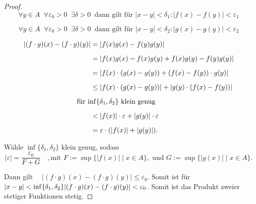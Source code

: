 \documentclass[a4paper,12pt]{article}
\theoremstyle{definition}
\theoremstyle{remark}
\begin{document}
\begin{proof}

\[
\forall y \in A \;\; \forall \varepsilon_0 > 0 \;\; \exists \delta > 0 \;\; 
\text{dann gilt für } |x-y| < \delta_1 : |f(x) - f(y)| < \varepsilon_1
\]

\[
\forall y \in A \;\; \forall \varepsilon_0 > 0 \;\; \exists \delta > 0 \;\; 
\text{dann gilt für } |x-y| < \delta_2 : |g(x) - g(y)| < \varepsilon_2
\]

\begin{align*}
|(f \cdot g)(x) - (f \cdot g)(y)| 
&= | f(x) g(x) - f(y) g(y) | \\[2mm]
&= | f(x) g(x) - f(x) g(y) + f(x) g(y) - f(y) g(y) | \\[2mm]
&= | f(x) \cdot (g(x) - g(y)) + (f(x) - f(y)) \cdot g(y) | \\[2mm]
&\leq | f(x) \cdot (g(x) - g(y)) | + | g(y) \cdot (f(x) - f(y)) | \\[2mm]
\makebox[0pt][l]{\hspace{-2em}für $\inf\{\delta_1, \delta_2\}$ klein genug} \\[2mm]
&< | f(x) | \cdot \varepsilon + | g(y) | \cdot \varepsilon  \\[2mm]
& = \varepsilon \cdot (|f(x)| + |g(y)|).
\end{align*}

Wähle $\inf\{\delta_1, \delta_2\}$ klein genug, sodass 
\[
\vert \varepsilon \vert = \frac{\varepsilon_0}{F + G} \quad,
\text{mit }
F := \sup \{ |f(x)| \mid x \in A \}, 
\text{ und }
G := \sup \{ |g(x)| \mid x \in A \}.
\]

Dann gilt $\quad |(f \cdot g)(x) - (f \cdot g)(y)| \leq \varepsilon_0.$ Somit ist für 
$\vert x-y \vert < \inf\{\delta_1, \delta_2\} \\ \vert(f\cdot g)(x) - (f\cdot g)(y)\vert < \varepsilon_0$. 
Somit ist das Produkt zweier stetiger Funktionen stetig. 


\end{proof}
\end{document}
